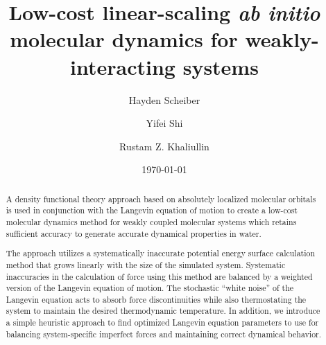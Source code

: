 \documentclass[aps,prl,reprint,amsmath,amssymb]{revtex4-1}
\begin{document}
\title{
Low-cost linear-scaling \emph{ab initio} molecular dynamics for weakly-interacting systems
}

\author{Hayden Scheiber}
\author{Yifei Shi}
\author{Rustam Z. Khaliullin}

\date{\today}

\begin{abstract}
A density functional theory approach based on absolutely localized molecular orbitals is used in conjunction with the Langevin equation of motion to create a low-cost molecular dynamics method for weakly coupled molecular systems which retains sufficient accuracy to generate accurate dynamical properties in water. 

The approach utilizes a systematically inaccurate potential energy surface calculation method that grows linearly with the size of the simulated system. 
Systematic inaccuracies in the calculation of force using this method are balanced by a weighted version of the Langevin equation of motion. 
The stochastic ``white noise'' of the Langevin equation acts to absorb force discontinuities while also thermostating the system to maintain the desired thermodynamic temperature. 
In addition, we introduce a simple heuristic approach to find optimized Langevin equation parameters to use for balancing system-specific imperfect forces and maintaining correct dynamical behavior.


\end{abstract}
\end{document}

